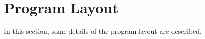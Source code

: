 \chapter{Program Layout}
\label{chp:proglayout}

In this section, some details of the program layout are described.
